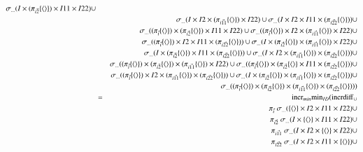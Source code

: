 \begin{eqnarray*}
\sigma_{ \dots}(I \times ( \pi_{\vec{i2}} \{\tuple{} \} ) \times I11 \times I22) \cup \\
&&\sigma_{ \dots}(I \times  I2 \times  ( \pi_{\vec{i11}} \{\tuple{} \}) \times I22) \cup 
\sigma_{ \dots}(I \times I2 \times I11 \times ( \pi_{\vec{i22}} \{\tuple{} \} )) \cup \\
&&\sigma_{ \dots}(( \pi_{\vec{i}} \{\tuple{} \} ) \times  ( \pi_{\vec{i2}} \{\tuple{} \} ) \times I11 \times I22) \cup 
\sigma_{ \dots}(( \pi_{\vec{i}} \{\tuple{} \} ) \times I2 \times ( \pi_{\vec{i11}} \{\tuple{} \} ) \times I22) \cup \\
&&\sigma_{ \dots}(( \pi_{\vec{i}} \{\tuple{} \} ) \times I2 \times I11 \times ( \pi_{\vec{i22}} \{\tuple{} \} )) \cup 
\sigma_{ \dots}(I \times  ( \pi_{\vec{i2}} \{\tuple{} \} ) \times  ( \pi_{\vec{i11}} \{\tuple{} \} ) \times I22) \cup \\
&&\sigma_{ \dots}(I \times  ( \pi_{\vec{i2}} \{\tuple{} \} ) \times I11 \times ( \pi_{\vec{i22}} \{\tuple{} \} )) \cup 
\sigma_{ \dots}(I \times I2 \times ( \pi_{\vec{i11}} \{\tuple{} \} ) \times ( \pi_{\vec{i22}} \{\tuple{} \} )) \cup \\
&&\sigma_{ \dots}(( \pi_{\vec{i}} \{\tuple{} \} ) \times ( \pi_{\vec{i2}} \{\tuple{} \} ) \times ( \pi_{\vec{i11}} \{\tuple{} \} ) \times I22) \cup 
\sigma_{ \dots}(( \pi_{\vec{i}} \{\tuple{} \} ) \times ( \pi_{\vec{i2}} \{\tuple{} \}  \times  I11 \times ( \pi_{\vec{i22}} \{\tuple{} \} )) \cup \\
&&\sigma_{ \dots}(( \pi_{\vec{i}} \{\tuple{} \} ) \times I2 \times  ( \pi_{\vec{i11}} \{\tuple{} \} ) \times ( \pi_{\vec{i22}} \{\tuple{} \} )) \cup 
\sigma_{ \dots}(I \times ( \pi_{\vec{i2}} \{\tuple{} \} ) \times ( \pi_{\vec{i11}} \{\tuple{} \} ) \times ( \pi_{\vec{i22}} \{\tuple{} \} )) \cup \\
&&\sigma_{ \dots}(( \pi_{\vec{i}} \{\tuple{} \} ) \times ( \pi_{\vec{i2}} \{\tuple{} \} ) \times ( \pi_{\vec{i11}} \{\tuple{} \} ) \times ( \pi_{\vec{i22}} \{\tuple{} \} ))) \\
%
&=& \algincr_{min} \algmin_{ID} (\algincrdiff_{\cup} \\
&& \pi_{\vec{i}} \;\sigma_{ \dots}(  \{\tuple{} \} \times I2 \times I11 \times I22) \cup \\
&& \pi_{\vec{i2}} \;\sigma_{ \dots}(I \times \{\tuple{} \} \times I11 \times I22) \cup \\
&& \pi_{\vec{i11}} \;\sigma_{ \dots}(I \times  I2 \times  \{\tuple{} \} \times I22) \cup \\
&& \pi_{\vec{i22}} \;\sigma_{ \dots}(I \times I2 \times I11 \times \{\tuple{} \} ) \cup \\

\end{eqnarray*}
